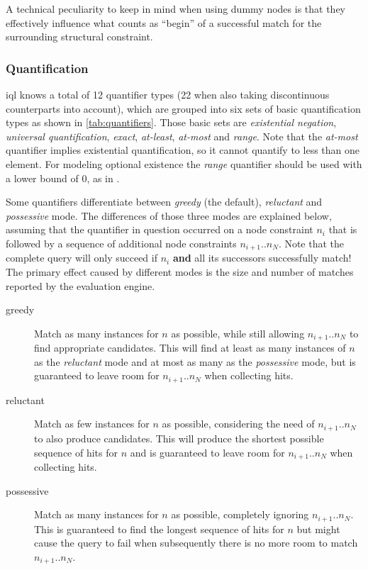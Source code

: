 \documentclass[11pt,a4paper]{report}
\begin{document}
A technical peculiarity to keep in mind when using dummy nodes is that they effectively influence what counts as ``begin'' of a successful match for the surrounding structural constraint.

\subsubsection{Quantification}
\label{sec:quantification}
\ac{iql} knows a total of 12 quantifier types (22 when also taking discontinuous counterparts into account), which are grouped into six sets of basic quantification types as shown in \cref{tab:quantifiers}.
Those basic sets are \textit{existential negation}, \textit{universal quantification}, \textit{exact}, \textit{at-least}, \textit{at-most} and \textit{range}.
Note that the \textit{at-most} quantifier implies existential quantification, so it cannot quantify to less than one element. 
For modeling optional existence the \textit{range} quantifier should be used with a lower bound of 0, as in .

Some quantifiers differentiate between \textit{greedy} (the default), \textit{reluctant} and \textit{possessive} mode.
The differences of those three modes are explained below, assuming that the quantifier in question occurred on a node constraint $n_i$ that is followed by a sequence of additional node constraints $n_{i+1}..n_N$.
Note that the complete query will only succeed if $n_i$ \textbf{and} all its successors successfully match!
The primary effect caused by different modes is the size and number of matches reported by the evaluation engine.
\begin{description}
	\item[greedy] Match as many instances for $n$ as possible, while still allowing $n_{i+1}..n_N$ to find appropriate candidates. This will find at least as many instances of $n$ as the \textit{reluctant} mode and at most as many as the \textit{possessive} mode, but is guaranteed to leave room for $n_{i+1}..n_N$ when collecting hits.
	\item[reluctant] Match as few instances for $n$ as possible, considering the need of $n_{i+1}..n_N$ to also produce candidates. This will produce the shortest possible sequence of hits for $n$ and is guaranteed to leave room for $n_{i+1}..n_N$ when collecting hits.
	\item[possessive] Match as many instances for $n$ as possible, completely ignoring $n_{i+1}..n_N$. This is guaranteed to find the longest sequence of hits for $n$ but might cause the query to fail when subsequently there is no more room to match $n_{i+1}..n_N$.
\end{description}
\end{document}
